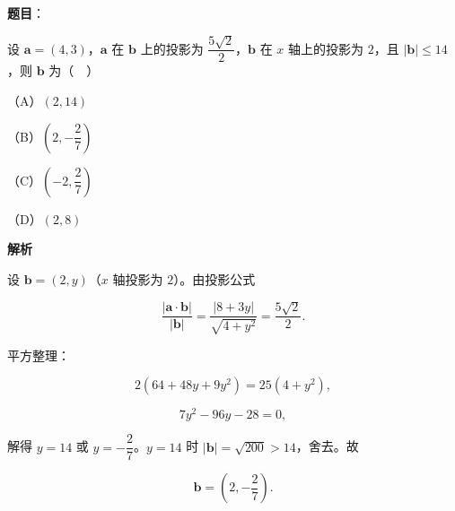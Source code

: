 \begin{answer}

\textbf{题目}：

设 $\boldsymbol a=(4,3)$，$\boldsymbol a$ 在 $\boldsymbol b$ 上的投影为 $\dfrac{5\sqrt2}{2}$，$\boldsymbol b$ 在 $x$ 轴上的投影为 $2$，且 $|\boldsymbol b|\leqslant14$，则 $\boldsymbol b$ 为（　）

（A）$(2,14)$

（B）$\left(2,-\dfrac27\right)$

（C）$\left(-2,\dfrac27\right)$

（D）$(2,8)$

\textbf{解析}

设 $\boldsymbol b=(2,y)$（$x$ 轴投影为 $2$）。由投影公式

\nopagebreak[4]
\[\frac{|\boldsymbol a\cdot\boldsymbol b|}{|\boldsymbol b|}
=\frac{|8+3y|}{\sqrt{4+y^2}}=\frac{5\sqrt2}{2}.\]

平方整理：

\nopagebreak[4]
\[2(64+48y+9y^2)=25(4+y^2),\]

\nopagebreak[4]
\[7y^2-96y-28=0,\]

解得 $y=14$ 或 $y=-\dfrac27$。$y=14$ 时 $|\boldsymbol b|=\sqrt{200}>14$，舍去。故

\nopagebreak[4]
\[\boldsymbol b=\left(2,-\frac27\right).\]


\end{answer}

